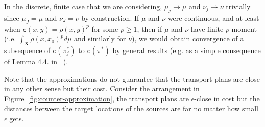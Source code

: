 \documentclass[twoside,11pt]{article}
\newcommand{\cost}[0]{\mathtt{c}}
\newcommand{\coupling}[0]{\pi}
\newcommand{\Xsp}{{\mathbf{X}}}
\begin{document}

In the discrete, finite case that we are considering, $\mu_j\rightarrow\mu$ and
$\nu_j\rightarrow\nu$ trivially since $\mu_J=\mu$ and $\nu_J=\nu$ by
construction. If $\mu$ and $\nu$ were continuous, and at least when
$\cost(x,y)=\rho(x,y)^p$ for some $p\ge1$, then if $\mu$ and $\nu$ have finite
$p$-moment (i.e. $\int_\Xsp \rho(x,x_0)^pd\mu$ and similarly for $\nu$), we
would obtain convergence of a subsequence of $\cost(\coupling^*_j)$ to $\cost(\coupling^*)$ by
general results (e.g. as a simple consequence of Lemma 4.4. in ~\citep{villani:book2009}).

Note that the approximations do not guarantee that the transport plans are
close in any other sense but their cost. Consider the arrangement in
Figure~\ref{fig:counter-approximation}, the transport plans are
$\epsilon$-close in cost but the distances between the target locations of the
sources are far no matter how small $\epsilon$ gets.  
\end{document}
